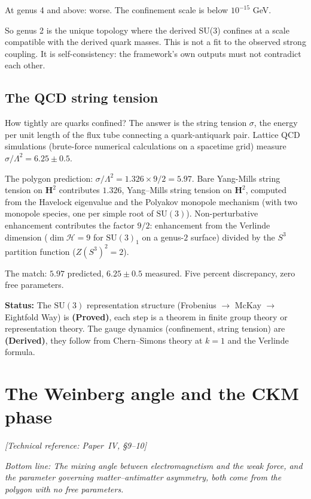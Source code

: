 At genus 4 and above: worse. The confinement scale is below
$10^{-15}$ GeV.

So genus 2 is the unique topology where the derived SU(3)
confines at a scale compatible with the derived quark masses.
This is not a fit to the observed strong coupling. It is
self-consistency: the framework's own outputs must not
contradict each other.

\subsection*{The QCD string tension}

How tightly are quarks confined? The answer is the string tension
$\sigma$, the energy per unit length of the flux tube connecting a
quark-antiquark pair. Lattice QCD simulations (brute-force numerical
calculations on a spacetime grid) measure
$\sigma/\Lambda^2 = 6.25 \pm 0.5$.

The polygon prediction: $\sigma/\Lambda^2 = 1.326 \times 9/2 = 5.97$.
Bare Yang-Mills string tension on
$\mathbf{H}^2$ contributes $1.326$, Yang--Mills string tension on
$\mathbf{H}^2$, computed from the Havelock eigenvalue and the Polyakov
monopole mechanism (with two monopole species, one per simple root of
$\mathrm{SU}(3)$). Non-perturbative enhancement contributes the factor $9/2$:
enhancement from the Verlinde dimension
($\dim \mathcal{H} = 9$ for $\mathrm{SU}(3)_1$ on a genus-$2$ surface)
divided by the $S^3$ partition function ($Z(S^3)^2 = 2$).

The match: $5.97$ predicted, $6.25 \pm 0.5$ measured. Five percent
discrepancy, zero free parameters.

\textbf{Status:} The $\mathrm{SU}(3)$ representation structure
(Frobenius $\to$ McKay $\to$ Eightfold Way) is \textbf{(Proved)}, each
step is a theorem in finite group theory or representation theory.
The gauge dynamics (confinement, string tension) are
\textbf{(Derived)}, they follow from Chern--Simons theory at $k = 1$
and the Verlinde formula.


\section{The Weinberg angle and the CKM phase}
\noindent\textit{[Technical reference: Paper~IV, \S9--10]}

\medskip

\noindent\textit{Bottom line: The mixing angle between
electromagnetism and the weak force, and the parameter governing
matter--antimatter asymmetry, both come from the polygon with no free
parameters.}

